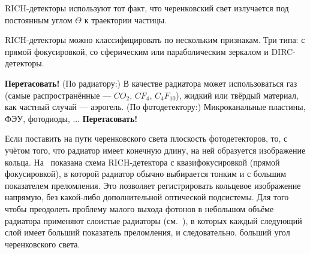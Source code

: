 RICH-детекторы используют тот факт, что черенковский свет излучается под постоянным углом $\Theta$ к траектории частицы.

RICH-детекторы можно классифицировать по нескольким признакам. Три типа: с прямой фокусировкой, со сферическим или параболическим зеркалом и DIRC-детекторы.

\textbf{Перетасовать!}
(По радиатору:) В качестве радиатора может использоваться газ (самые распространённые --- $CO_{2}$, $CF_{4}$, $C_{4}F_{10}$), жидкий или твёрдый материал, как частный случай --- аэрогель.
(По фотодетектору:) Микроканальные пластины, ФЭУ, фотодиоды, ...
\textbf{Перетасовать!}

Если поставить на пути черенковского света плоскость фотодетекторов, то, с учётом того, что радиатор имеет конечную длину, на ней образуется изображение кольца. На~ показана схема RICH-детектора с квазифокусировкой (прямой фокусировкой), в которой радиатор обычно выбирается тонким и с большим показателем преломления. Это позволяет регистрировать кольцевое изображение напрямую, без какой-либо дополнительной оптической подсистемы. Для того чтобы преодолеть проблему малого выхода фотонов в небольшом объёме радиатора применяют слоистые радиаторы (см.~), в которых каждый следующий слой имеет больший показатель преломления, и следовательно, больший угол черенковского света.


